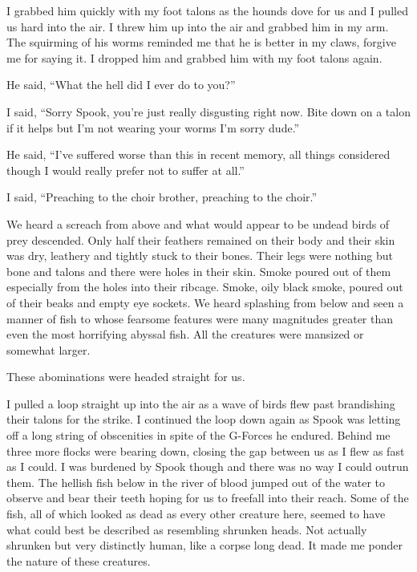 I grabbed him quickly with my foot talons as the hounds dove for us and I pulled us hard into the air. I threw him up into the air and grabbed him in my arm. The squirming of his worms reminded me that he is better in my claws, forgive me for saying it. I dropped him and grabbed him with my foot talons again.

He said, ``What the hell did I ever do to you?''

I said, ``Sorry Spook, you're just really disgusting right now. Bite down on a talon if it helps but I'm not wearing your worms I'm sorry dude.''

He said, ``I've suffered worse than this in recent memory, all things considered though I would really prefer not to suffer at all.''

I said, ``Preaching to the choir brother, preaching to the choir.''

\parasep

We heard a screach from above and what would appear to be undead birds of prey descended. Only half their feathers remained on their body and their skin was dry, leathery and tightly stuck to their bones. Their legs were nothing but bone and talons and there were holes in their skin. Smoke poured out of them especially from the holes into their ribcage. Smoke, oily black smoke, poured out of their beaks and empty eye sockets. We heard splashing from below and seen a manner of fish to whose fearsome features were many magnitudes greater than even the most horrifying abyssal fish. All the creatures were mansized or somewhat larger.

These abominations were headed straight for us.

I pulled a loop straight up into the air as a wave of birds flew past brandishing their talons for the strike. I continued the loop down again as Spook was letting off a long string of obscenities in spite of the G-Forces he endured. Behind me three more flocks were bearing down, closing the gap between us as I flew as fast as I could. I was burdened by Spook though and there was no way I could outrun them. The hellish fish below in the river of blood jumped out of the water to observe and bear their teeth hoping for us to freefall into their reach. Some of the fish, all of which looked as dead as every other creature here, seemed to have what could best be described as resembling shrunken heads. Not actually shrunken but very distinctly human, like a corpse long dead. It made me ponder the nature of these creatures.

